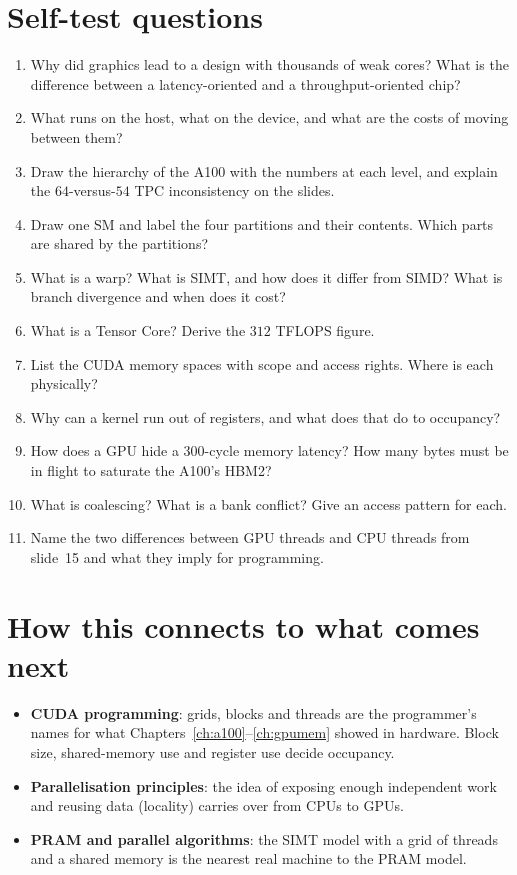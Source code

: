 \section{Self-test questions}

\begin{enumerate}
  \item Why did graphics lead to a design with thousands of weak cores? What is the difference between a latency-oriented and a throughput-oriented chip?
  \item What runs on the host, what on the device, and what are the costs of moving between them?
  \item Draw the hierarchy of the A100 with the numbers at each level, and explain the $64$-versus-$54$ TPC inconsistency on the slides.
  \item Draw one SM and label the four partitions and their contents. Which parts are shared by the partitions?
  \item What is a warp? What is SIMT, and how does it differ from SIMD? What is branch divergence and when does it cost?
  \item What is a Tensor Core? Derive the $312$ TFLOPS figure.
  \item List the CUDA memory spaces with scope and access rights. Where is each physically?
  \item Why can a kernel run out of registers, and what does that do to occupancy?
  \item How does a GPU hide a $300$-cycle memory latency? How many bytes must be in flight to saturate the A100's HBM2?
  \item What is coalescing? What is a bank conflict? Give an access pattern for each.
  \item Name the two differences between GPU threads and CPU threads from slide~15 and what they imply for programming.
\end{enumerate}

\section{How this connects to what comes next}

\begin{itemize}
  \item \textbf{CUDA programming}: grids, blocks and threads are the programmer's names for what Chapters~\ref{ch:a100}--\ref{ch:gpumem} showed in hardware. Block size, shared-memory use and register use decide occupancy.
  \item \textbf{Parallelisation principles}: the idea of exposing enough independent work and reusing data (locality) carries over from CPUs to GPUs.
  \item \textbf{PRAM and parallel algorithms}: the SIMT model with a grid of threads and a shared memory is the nearest real machine to the PRAM model.
\end{itemize}

